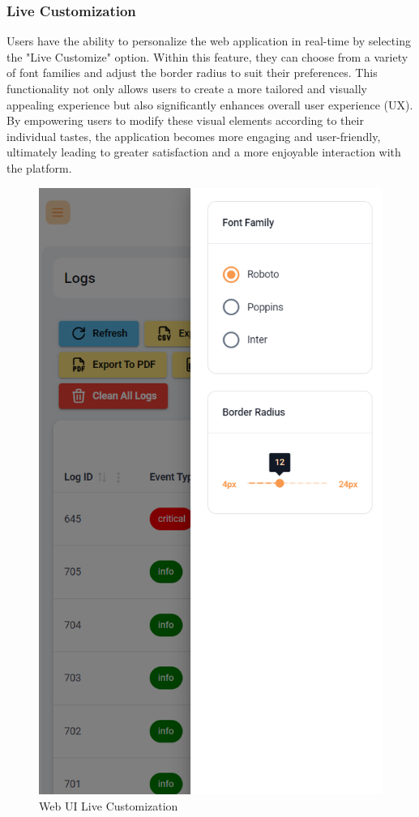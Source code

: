 	\subsubsection{Live Customization}
	Users have the ability to personalize the web application in real-time by selecting the "Live Customize" option. Within this feature, they can choose from a variety of font families and adjust the border radius to suit their preferences. This functionality not only allows users to create a more tailored and visually appealing experience but also significantly enhances overall user experience (UX). By empowering users to modify these visual elements according to their individual tastes, the application becomes more engaging and user-friendly, ultimately leading to greater satisfaction and a more enjoyable interaction with the platform.
	\begin{figure}[H]
		\centering
		\includegraphics[width=0.5\linewidth]{graphics/responsive/live-custom}
		\caption{Web UI Live Customization}
		\label{fig:live-custom}
	\end{figure}
	
	
	












%	
	


	